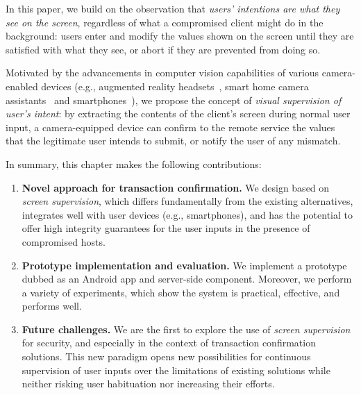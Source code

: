  In this paper, we build on the observation that \textit{users' intentions are what they see on the screen}, regardless of what a compromised client might do in the background: users enter and modify the values shown on the screen until they are satisfied with what they see, or abort if they are prevented from doing so.

Motivated by the advancements in computer vision capabilities of various camera-enabled devices (e.g., augmented reality headsets~\cite{TimCookAR, HoloLens2}, smart home camera assistants~\cite{fleck2008smart, lenovoSmartHome} and smartphones~\cite{wald2018real, smartphonesCV}), we propose the concept of \emph{visual supervision of user's intent}: by extracting the contents of the client's screen during normal user input, a camera-equipped device can confirm to the remote service the values that the legitimate user intends to submit, or notify the user of any mismatch.


In summary, this chapter makes the following contributions:

\begin{enumerate}

\item \textbf{Novel approach for transaction confirmation.} We design \sysname based on \emph{screen supervision}, which differs fundamentally from the existing alternatives, integrates well with user devices (e.g., smartphones), and has the potential to offer high integrity guarantees for the user inputs in the presence of compromised hosts.

\item \textbf{Prototype implementation and evaluation.} We implement a prototype dubbed \sysname as an Android app and server-side component. Moreover, we perform a variety of experiments, which show the system is practical, effective, and performs well. 

\item \textbf{Future challenges.} We are the first to explore the use of \emph{screen supervision} for security, and especially in the context of transaction confirmation solutions. This new paradigm opens new possibilities for continuous supervision of user inputs over the limitations of existing solutions while neither risking user habituation nor increasing their efforts.


\end{enumerate}
